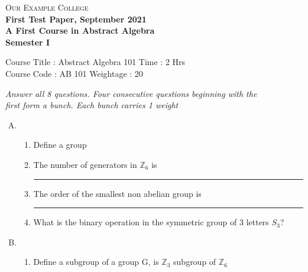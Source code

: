 \documentclass[a4paper]{article}
\begin{document}
\begin{center}
\Large \textsc{Our Example College}\\
\bfseries
First Test Paper, September 2021\\
\large A First Course in Abstract Algebra\\[4mm]
Semester I
\normalsize
\end{center}
Course Title : Abstract Algebra 101 \hspace{80mm} Time : 2 Hrs \\
Course Code : AB 101 \hspace{100.55mm} Weightage : 20 \\[2mm]
\begin{center}
\textit{Answer all 8 questions. Four consecutive questions beginning with the\\
first form a bunch. Each bunch carries 1 weight}
\end{center}

\begin{enumerate}[A)]
\item
\begin{enumerate}[(1)]
\item Define a group
\item The number of generators in $\mathbb{Z}_6$ is \rule{20mm}{0.2mm}
\item The order of the smallest non abelian group is \rule{20mm}{0.2mm}
\item What is the binary operation in the symmetric group of 3 letters $S_3$?
\end{enumerate}
\item
\begin{enumerate}[(1)]
\item Define a subgroup of a group G, is $\mathbb{Z}_3$ subgroup of $\mathbb{Z}_6$
\end{enumerate}
\end{enumerate}
\end{document}
